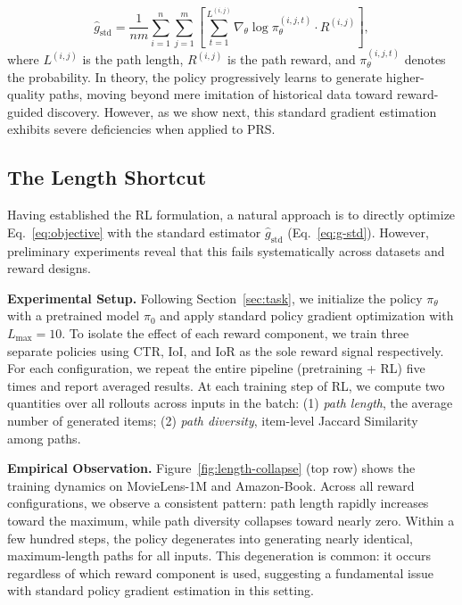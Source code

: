 \begin{equation}
\hat{g}_{\mathrm{std}} = \frac{1}{nm}\sum_{i=1}^{n}\sum_{j=1}^{m}\left[\sum_{t=1}^{L^{(i,j)}} \nabla_\theta \log \pi_\theta^{(i, j, t)} \cdot R^{(i,j)}\right],
\label{eq:g-std}
\end{equation}
where $L^{(i,j)}$ is the path length, $R^{(i,j)}$ is the path reward, and $\pi_\theta^{(i, j, t)}$ denotes the probability. In theory, the policy progressively learns to generate higher-quality paths, moving beyond mere imitation of historical data toward reward-guided discovery. However, as we show next, this standard gradient estimation exhibits severe deficiencies when applied to PRS.

\subsection{The Length Shortcut}
\label{sec:analysis}
 
Having established the RL formulation, a natural approach is to directly optimize Eq.~\eqref{eq:objective} with the standard estimator $\hat{g}_{\mathrm{std}}$ (Eq.~\eqref{eq:g-std}). However, preliminary experiments reveal that this fails systematically across datasets and reward designs.
 
\textbf{Experimental Setup.} Following Section~\ref{sec:task}, we initialize the policy $\pi_\theta$ with a pretrained model $\pi_0$ and apply standard policy gradient optimization with $L_{\max}=10$. To isolate the effect of each reward component, we train three separate policies using CTR, IoI, and IoR as the sole reward signal respectively. For each configuration, we repeat the entire pipeline (pretraining + RL) five times and report averaged results. At each training step of RL, we compute two quantities over all rollouts across inputs in the batch: (1) \emph{path length}, the average number of generated items; (2) \emph{path diversity}, item-level Jaccard Similarity among paths.
 
\textbf{Empirical Observation.} Figure~\ref{fig:length-collapse} (top row) shows the training dynamics on MovieLens-1M and Amazon-Book. Across all reward configurations, we observe a consistent pattern: path length rapidly increases toward the maximum, while path diversity collapses toward nearly zero. Within a few hundred steps, the policy degenerates into generating nearly identical, maximum-length paths for all inputs. This degeneration is common: it occurs regardless of which reward component is used, suggesting a fundamental issue with standard policy gradient estimation in this setting.
 
